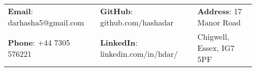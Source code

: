 \documentclass[letterpaper, 11pt]{article}
\begin{document}


\vspace{0.5cm} 
\begin{center}
\begin{tabular}{lll}
\textbf{Email}: darhasha5@gmail.com      &
\hspace{0.4in} \textbf{GitHub}: github.com/hashadar    &
\hspace{0.3in} 	\textbf{Address}: 17 Manor Road \\

\textbf{Phone}: +44 7305 576221   & 
\hspace{0.4in} \textbf{LinkedIn}: linkedin.com/in/hdar/   & 
\hspace{0.3in} Chigwell, Essex, IG7 5PF 
\end{tabular}
\end{center}


\setlength{\tabcolsep}{8pt}
\end{document}
